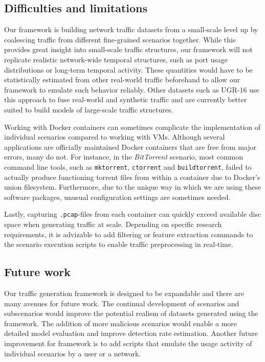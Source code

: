 \subsection{Difficulties and limitations}

Our framework is building network traffic datasets from a small-scale level up by coalescing traffic from different fine-grained scenarios together. While this provides great insight into small-scale traffic structures, our framework will not replicate realistic network-wide temporal structures, such as port usage distributions or long-term temporal activity. These quantities would have to be statistically estimated from other real-world traffic beforehand to allow our framework to emulate such behavior reliably. Other datasets such as UGR-16 use this approach to fuse real-world and synthetic traffic and are currently better suited to build models of large-scale traffic structures.

Working with Docker containers can sometimes complicate the implementation of individual scenarios compared to working with VMs. Although several applications are officially maintained Docker containers that are free from major errors, many do not. For instance, in the \textit{BitTorrent} scenario, most common command line tools, such as \texttt{mktorrent}, \texttt{ctorrent} and \texttt{buildtorrent}, failed to actually produce functioning torrent files from within a container due to Docker's union filesystem. Furthermore, due to the unique way in which we are using these software packages, unusual configuration settings are sometimes needed. %

Lastly, capturing \texttt{.pcap}-files from each container can quickly exceed available disc space when generating traffic at scale. Depending on specific research requirements, it is advizable to add filtering or feature extraction commands to the scenario execution scripts to enable traffic preprocessing in real-time.


\subsection{Future work}

Our traffic generation framework is designed to be expandable and there are many avenues for future work. The continual development of scenarios and subscenarios would improve the potential realism of datasets generated using the framework. The addition of more malicious scenarios would enable a more detailed model evaluation and improve detection rate estimation. 
Another future improvement for framework is to add scripts that emulate the usage activity of individual scenarios by a user or a network. 


